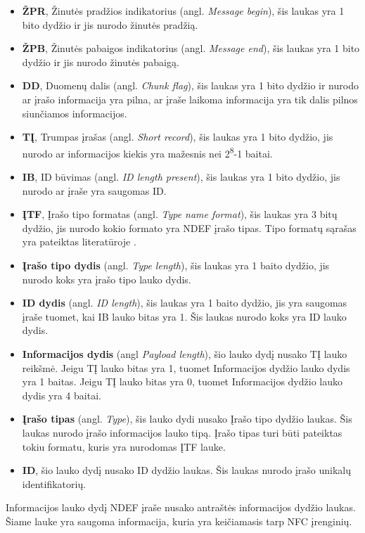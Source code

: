 \begin{itemize}
    \item \textbf{ŽPR}, Žinutės pradžios indikatorius (angl. \textit{Message begin}), šis laukas yra 1 bito dydžio ir jis nurodo žinutės pradžią.
    \item \textbf{ŽPB}, Žinutės pabaigos indikatorius (angl. \textit{Message end}), šis laukas yra 1 bito dydžio ir jis nurodo žinutės pabaigą.
    \item \textbf{DD}, Duomenų dalis (angl. \textit{Chunk flag}), šis laukas yra 1 bito dydžio ir nurodo ar įrašo informacija yra pilna, ar įraše laikoma informacija yra tik dalis pilnos siunčiamos informacijos.
    \item \textbf{TĮ}, Trumpas įrašas (angl. \textit{Short record}), šis laukas yra 1 bito dydžio, jis nurodo ar informacijos kiekis yra mažesnis nei 2\textsuperscript{8}-1 baitai.
    \item \textbf{IB}, ID būvimas (angl. \textit{ID length present}), šis laukas yra 1 bito dydžio, jis nurodo ar įraše yra saugomas ID.
    \item \textbf{ĮTF}, Įrašo tipo formatas (angl. \textit{Type name format}), šis laukas yra 3 bitų dydžio, jis nurodo kokio formato yra NDEF įrašo tipas. Tipo formatų sąrašas yra pateiktas literatūroje \cite{Leora1980}.
    \item \textbf{Įrašo tipo dydis} (angl. \textit{Type length}), šis laukas yra 1 baito dydžio, jis nurodo koks yra įrašo tipo lauko dydis.
    \item \textbf{ID dydis} (angl. \textit{ID length}), šis laukas yra 1 baito dydžio, jis yra saugomas įraše tuomet, kai IB lauko bitas yra 1. Šis laukas nurodo koks yra ID lauko dydis.
    \item \textbf{Informacijos dydis} (angl \textit{Payload length}), šio lauko dydį nusako TĮ lauko reikšmė. Jeigu TĮ lauko bitas yra 1, tuomet Informacijos dydžio lauko dydis yra 1 baitas. Jeigu TĮ lauko bitas yra 0, tuomet Informacijos dydžio lauko dydis yra 4 baitai.
    \item \textbf{Įrašo tipas} (angl. \textit{Type}), šis lauko dydi nusako Įrašo tipo dydžio laukas. Šis laukas nurodo įrašo informacijos lauko tipą. Įrašo tipas turi būti pateiktas tokiu formatu, kuris yra nurodomas ĮTF lauke.
    \item \textbf{ID}, šio lauko dydį nusako ID dydžio laukas. Šis laukas nurodo įrašo unikalų identifikatorių.
\end{itemize}
Informacijos lauko dydį NDEF įraše nusako antraštės informacijos dydžio laukas. Šiame lauke yra saugoma informacija, kuria yra keičiamasis tarp NFC įrenginių.

